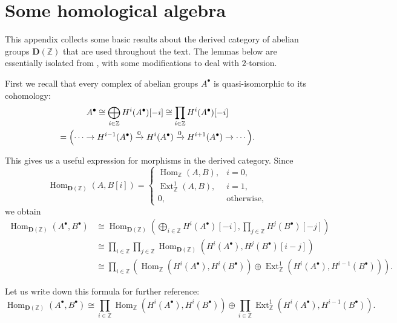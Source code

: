 \documentclass[leqno,12pt]{article}
\theoremstyle{plain}
\theoremstyle{definition}
\DeclareMathOperator{\Hom}{Hom}
\DeclareMathOperator{\Ext}{Ext}
\newcommand{\ZZ}{\mathbb{Z}}
\begin{document}

\pagebreak
\appendix
\section{Some homological algebra}
\label{app:homological-algebra}

This appendix collects some basic results about the derived category of abelian
groups $\mathbf{D} (\ZZ)$ that are used throughout the text. The lemmas below
are essentially isolated from \cite{Flach-Morin-2018}, with some modifications
to deal with $2$-torsion.

First we recall that every complex of abelian groups $A^\bullet$ is
quasi-isomorphic to its cohomology:
\begin{multline*}
  A^\bullet \cong \bigoplus_{i\in \ZZ} H^i (A^\bullet) [-i] \cong
  \prod_{i\in \ZZ} H^i (A^\bullet) [-i] \\
  = \Bigl(\cdots \to H^{i-1} (A^\bullet) \xrightarrow{0} H^i (A^\bullet)
  \xrightarrow{0} H^{i+1} (A^\bullet) \to \cdots\Bigr).
\end{multline*}

This gives us a useful expression for morphisms in the derived category.
Since
\[ \Hom_{\mathbf{D} (\ZZ)} (A,B [i]) = \begin{cases}
\Hom_\ZZ (A,B), & i = 0,\\
\Ext_\ZZ^1 (A,B), & i = 1,\\
0, & \text{otherwise},
\end{cases} \]
we obtain
\begin{align*}
  \Hom_{\mathbf{D} (\ZZ)} (A^\bullet, B^\bullet) & \cong
  \Hom_{\mathbf{D} (\ZZ)} (\bigoplus_{i\in\ZZ} H^i (A^\bullet) [-i], \prod_{j\in\ZZ} H^j (B^\bullet) [-j]) \\
  & \cong \prod_{i\in \ZZ} \prod_{j\in \ZZ} \Hom_{\mathbf{D} (\ZZ)} (H^i (A^\bullet), H^j (B^\bullet) [i-j]) \\
  & \cong \prod_{i\in \ZZ} \left(\Hom_\ZZ (H^i (A^\bullet), H^i (B^\bullet)) \oplus \Ext_\ZZ^1 (H^i (A^\bullet), H^{i-1} (B^\bullet))\right).
\end{align*}

Let us write down this formula for further reference:
\begin{equation}
  \label{eqn:morphisms-in-D(Z)}
  \Hom_{\mathbf{D} (\ZZ)} (A^\bullet, B^\bullet) \cong
  \prod_{i\in \ZZ} \Hom_\ZZ (H^i (A^\bullet), H^i (B^\bullet)) \oplus
  \prod_{i\in \ZZ} \Ext_\ZZ^1 (H^i (A^\bullet), H^{i-1} (B^\bullet)).
\end{equation}
\end{document}
